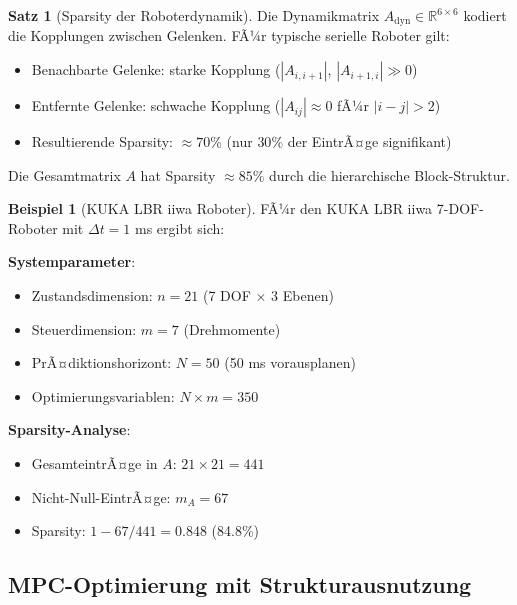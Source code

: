 ﻿\documentclass[a4paper,12pt]{report}
\theoremstyle{definition}
\newtheorem{beispiel}{Beispiel}
\newtheorem{satz}{Satz}
\begin{document}
	\begin{satz}[Sparsity der Roboterdynamik]
		Die Dynamikmatrix $A_{\text{dyn}} \in \mathbb{R}^{6 \times 6}$ kodiert die Kopplungen zwischen Gelenken. FÃ¼r typische serielle Roboter gilt:
		\begin{itemize}
			\item Benachbarte Gelenke: starke Kopplung ($|A_{i,i+1}|$, $|A_{i+1,i}| \gg 0$)
			\item Entfernte Gelenke: schwache Kopplung ($|A_{ij}| \approx 0$ fÃ¼r $|i-j| > 2$)
			\item Resultierende Sparsity: $\approx 70\%$ (nur $30\%$ der EintrÃ¤ge signifikant)
		\end{itemize}
		
		Die Gesamtmatrix $A$ hat Sparsity $\approx 85\%$ durch die hierarchische Block-Struktur.
	\end{satz}
	
	\begin{beispiel}[KUKA LBR iiwa Roboter]
		FÃ¼r den KUKA LBR iiwa 7-DOF-Roboter mit $\Delta t = 1$ ms ergibt sich:
		
		\textbf{Systemparameter}:
		\begin{itemize}
			\item Zustandsdimension: $n = 21$ (7 DOF $\times$ 3 Ebenen)
			\item Steuerdimension: $m = 7$ (Drehmomente)
			\item PrÃ¤diktionshorizont: $N = 50$ (50 ms vorausplanen)
			\item Optimierungsvariablen: $N \times m = 350$
		\end{itemize}
		
		\textbf{Sparsity-Analyse}:
		\begin{itemize}
			\item GesamteintrÃ¤ge in $A$: $21 \times 21 = 441$
			\item Nicht-Null-EintrÃ¤ge: $m_A = 67$
			\item Sparsity: $1 - 67/441 = 0.848$ (84.8\%)
		\end{itemize}
	\end{beispiel}
	
	\subsection{MPC-Optimierung mit Strukturausnutzung}
	
\end{document}
